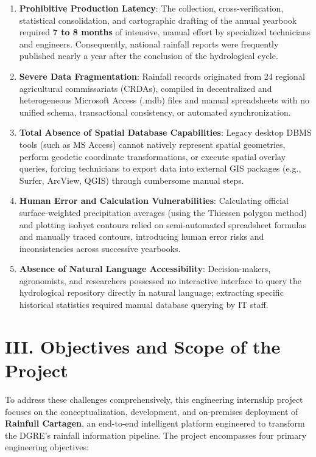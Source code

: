\documentclass[12pt,a4paper]{report}
\begin{document}
\begin{enumerate}[label=\textbf{\arabic*.}]
  \item \textbf{Prohibitive Production Latency}: The collection, cross-verification, statistical consolidation, and cartographic drafting of the annual yearbook required \textbf{7 to 8 months} of intensive, manual effort by specialized technicians and engineers. Consequently, national rainfall reports were frequently published nearly a year after the conclusion of the hydrological cycle.
  \item \textbf{Severe Data Fragmentation}: Rainfall records originated from 24 regional agricultural commissariats (CRDAs), compiled in decentralized and heterogeneous Microsoft Access (.mdb) files and manual spreadsheets with no unified schema, transactional consistency, or automated synchronization.
  \item \textbf{Total Absence of Spatial Database Capabilities}: Legacy desktop DBMS tools (such as MS Access) cannot natively represent spatial geometries, perform geodetic coordinate transformations, or execute spatial overlay queries, forcing technicians to export data into external GIS packages (e.g., Surfer, ArcView, QGIS) through cumbersome manual steps.
  \item \textbf{Human Error and Calculation Vulnerabilities}: Calculating official surface-weighted precipitation averages (using the Thiessen polygon method) and plotting isohyet contours relied on semi-automated spreadsheet formulas and manually traced contours, introducing human error risks and inconsistencies across successive yearbooks.
  \item \textbf{Absence of Natural Language Accessibility}: Decision-makers, agronomists, and researchers possessed no interactive interface to query the hydrological repository directly in natural language; extracting specific historical statistics required manual database querying by IT staff.
\end{enumerate}

\section*{III. Objectives and Scope of the Project}

To address these challenges comprehensively, this engineering internship project focuses on the conceptualization, development, and on-premises deployment of \textbf{Rainfull Cartagen}, an end-to-end intelligent platform engineered to transform the DGRE's rainfall information pipeline. The project encompasses four primary engineering objectives:
\end{document}
